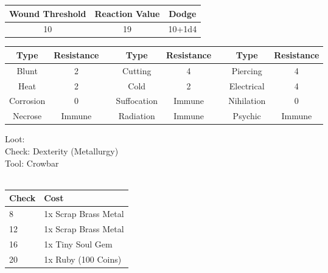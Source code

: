 \bigbreak
\begin{minipage}[H]{1\textwidth}
	\centering
	\begin{tabular}[c]{|c | c | c|}
		\hline
		Wound Threshold & Reaction Value & Dodge\\
		\hline
		10 & 19 & 10+1d4\\
		\hline
	\end{tabular}
\end{minipage}
\bigbreak
\noindent
\begin{minipage}[H]{1\textwidth}
	\centering
	\begin{tabular}[c]{|c | c | c | c | c | c | c | c|}  
		\hline
		Type & Resistance && Type & Resistance && Type & Resistance\\
		\hline
		Blunt & 2 && 
		Cutting & 4 && 
		Piercing & 4\\
		Heat & 2 && 
		Cold & 2 && 
		Electrical & 4\\
		Corrosion & 0 && 
		Suffocation & Immune && 
		Nihilation & 0 \\
		Necrose & Immune && 
		Radiation & Immune && 
		Psychic & Immune\\
		\hline
	\end{tabular}
\end{minipage}
\bigbreak
\noindent
Loot:\\
Check: Dexterity (Metallurgy)\\
Tool: Crowbar\\
\\
\begin{minipage}{0.8\textwidth}
	\begin{tabular}{|l | l|}
		\hline
		Check & Cost\\
		\hline
		8 & 1x Scrap Brass Metal\\
		12 & 1x Scrap Brass Metal\\
		16 & 1x Tiny Soul Gem\\
		20 & 1x Ruby (100 Coins)\\
		\hline
	\end{tabular}
\end{minipage}
\pagebreak